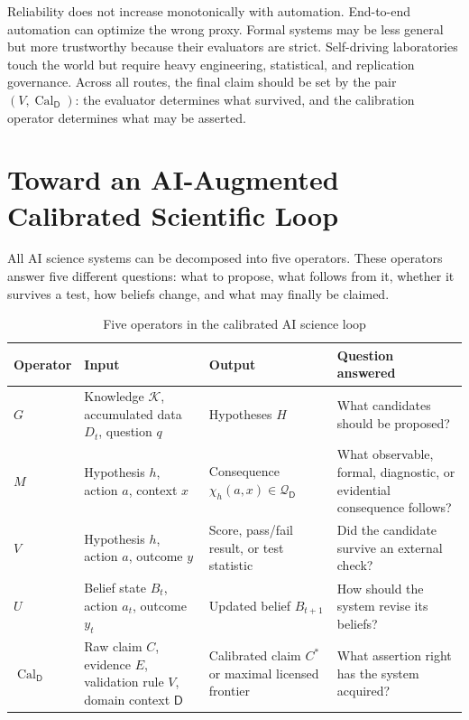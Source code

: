 \documentclass[11pt,a4paper]{article}
\newcommand{\Know}{\mathcal{K}}
\newcommand{\Cal}{\operatorname{Cal}}
\newcommand{\Dom}{\mathsf{D}}
\begin{document}
Reliability does not increase monotonically with automation. End-to-end automation can optimize the wrong proxy. Formal systems may be less general but more trustworthy because their evaluators are strict. Self-driving laboratories touch the world but require heavy engineering, statistical, and replication governance. Across all routes, the final claim should be set by the pair $(V,\Cal_{\Dom})$: the evaluator determines what survived, and the calibration operator determines what may be asserted.

\section{Toward an AI-Augmented Calibrated Scientific Loop}

All AI science systems can be decomposed into five operators. These operators answer five different questions: what to propose, what follows from it, whether it survives a test, how beliefs change, and what may finally be claimed.

\begin{table}[htbp]
\centering
\small
\caption{Five operators in the calibrated AI science loop}
\begin{tabularx}{\textwidth}{@{}p{1.6cm}p{3.4cm}p{3.4cm}Y@{}}
\toprule
Operator & Input & Output & Question answered \\
\midrule
$G$ & Knowledge $\Know$, accumulated data $D_t$, question $q$ & Hypotheses $H$ & What candidates should be proposed? \\
$M$ & Hypothesis $h$, action $a$, context $x$ & Consequence $\chi_h(a,x)\in\mathcal{Q}_{\Dom}$ & What observable, formal, diagnostic, or evidential consequence follows? \\
$V$ & Hypothesis $h$, action $a$, outcome $y$ & Score, pass/fail result, or test statistic & Did the candidate survive an external check? \\
$U$ & Belief state $B_t$, action $a_t$, outcome $y_t$ & Updated belief $B_{t+1}$ & How should the system revise its beliefs? \\
$\Cal_{\Dom}$ & Raw claim $C$, evidence $E$, validation rule $V$, domain context $\Dom$ & Calibrated claim $C^\ast$ or maximal licensed frontier & What assertion right has the system acquired? \\
\bottomrule
\end{tabularx}
\end{table}
\end{document}
